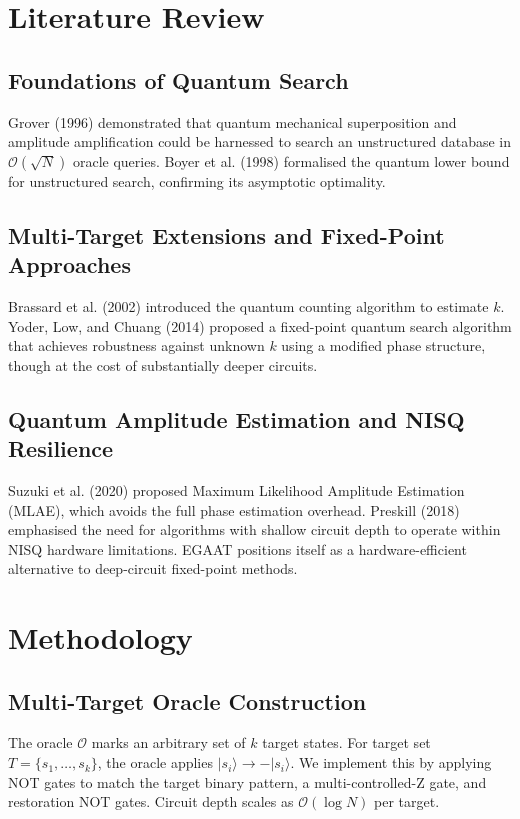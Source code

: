 \documentclass[journal]{IEEEtran}
\begin{document}
\section{Literature Review}
\subsection{Foundations of Quantum Search}
Grover (1996) demonstrated that quantum mechanical superposition and amplitude amplification could be harnessed to search an unstructured database in $\mathcal{O}(\sqrt{N})$ oracle queries. Boyer et al. (1998) formalised the quantum lower bound for unstructured search, confirming its asymptotic optimality.

\subsection{Multi-Target Extensions and Fixed-Point Approaches}
Brassard et al. (2002) introduced the quantum counting algorithm to estimate $k$. Yoder, Low, and Chuang (2014) proposed a fixed-point quantum search algorithm that achieves robustness against unknown $k$ using a modified phase structure, though at the cost of substantially deeper circuits.

\subsection{Quantum Amplitude Estimation and NISQ Resilience}
Suzuki et al. (2020) proposed Maximum Likelihood Amplitude Estimation (MLAE), which avoids the full phase estimation overhead. Preskill (2018) emphasised the need for algorithms with shallow circuit depth to operate within NISQ hardware limitations. EGAAT positions itself as a hardware-efficient alternative to deep-circuit fixed-point methods.

\section{Methodology}
\subsection{Multi-Target Oracle Construction}
The oracle $\mathcal{O}$ marks an arbitrary set of $k$ target states. For target set $T = \{s_1, \ldots, s_k\}$, the oracle applies $|s_i\rangle \to -|s_i\rangle$. We implement this by applying NOT gates to match the target binary pattern, a multi-controlled-Z gate, and restoration NOT gates. Circuit depth scales as $\mathcal{O}(\log N)$ per target.
\end{document}

